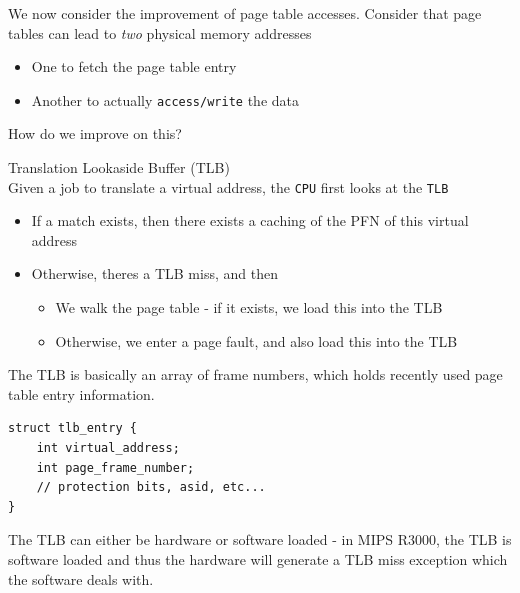 \documentclass[journal, letterpaper]{IEEEtran}
\begin{document}
We now consider the improvement of page table accesses. Consider that page tables can lead to \textit{two} physical memory addresses
\begin{itemize}
    \item One to fetch the page table entry
    \item Another to actually \verb|access/write| the data
\end{itemize}
How do we improve on this?
\begin{theory}{Translation Lookaside Buffer (TLB)} \\
    Given a job to translate a virtual address, the \verb|CPU| first looks at the \verb|TLB|
    \begin{itemize}
        \item If a match exists, then there exists a caching of the PFN of this virtual address
        \item Otherwise, theres a TLB miss, and then
        \begin{itemize}
            \item We walk the page table - if it exists, we load this into the TLB
            \item Otherwise, we enter a page fault, and also load this into the TLB
        \end{itemize}
    \end{itemize}
    The TLB is basically an array of frame numbers, which holds recently used page table entry information.
\begin{verbatim}
struct tlb_entry {
    int virtual_address;
    int page_frame_number;
    // protection bits, asid, etc...
}
\end{verbatim}
\end{theory}
The TLB can either be hardware or software loaded - in MIPS R3000, the TLB is software loaded and thus the hardware will generate a TLB miss exception which the software deals with.
\end{document}
